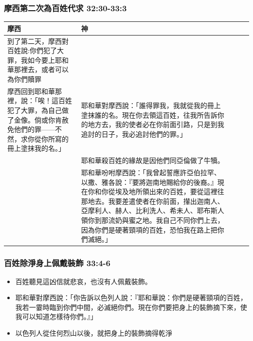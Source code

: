 \begin{table}
\subsubsection{摩西第二次為百姓代求 32:30-33:3}
\begin{table}[H]
\begin{threeparttable}
\begin{tabular}{@{}p{}*{4}{L{\tabcolsep\relax}}@{}}
\toprule
摩西 &  神 \\\hline
到了第二天，摩西對百姓說:你們犯了大罪，我如今要上耶和華那裡去，或者可以為你們贖罪&\tabularnewline\hline
摩西回到耶和華那裡，說：「唉！這百姓犯了大罪，為自己做了金像。倘或你肯赦免他們的罪——不然，求你從你所寫的冊上塗抹我的名。」&耶和華對摩西說：「誰得罪我，我就從我的冊上塗抹誰的名。現在你去領這百姓，往我所告訴你的地方去，我的使者必在你前面引路，只是到我追討的日子，我必追討他們的罪。」\tabularnewline\hline
&耶和華殺百姓的緣故是因他們同亞倫做了牛犢。\tabularnewline\hline
&耶和華吩咐摩西說：「我曾起誓應許亞伯拉罕、以撒、雅各說：『要將迦南地賜給你的後裔。』現在你和你從埃及地所領出來的百姓，要從這裡往那地去。我要差遣使者在你前面，攆出迦南人、亞摩利人、赫人、比利洗人、希未人、耶布斯人領你到那流奶與蜜之地。我自己不同你們上去，因為你們是硬著頸項的百姓，恐怕我在路上把你們滅絕。」\tabularnewline
\bottomrule
\end{tabular}
\end{threeparttable}
\end{table} 

\subsubsection{百姓除淨身上佩戴裝飾 33:4-6}
\begin{itemize}
\itemsep-.35em
\item 百姓聽見這凶信就悲哀，也沒有人佩戴裝飾。 
\item 耶和華對摩西說：「你告訴以色列人說：『耶和華說：你們是硬著頸項的百姓，我若一霎時臨到你們中間，必滅絕你們。現在你們要把身上的裝飾摘下來，使我可以知道怎樣待你們。』」 
\item 以色列人從住何烈山以後，就把身上的裝飾摘得乾淨
\end{itemize}


\end{table}
